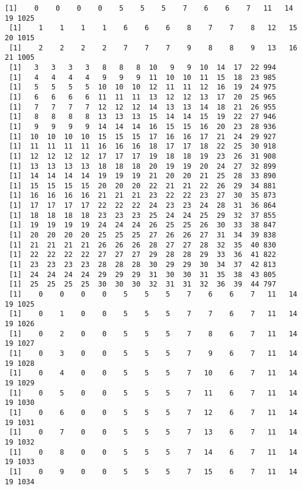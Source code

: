 \documentclass[11pt]{article}
\begin{document}
    \begin{Verbatim}[commandchars=\\\{\}]
 [1]    0    0    0    0    5    5    5    7    6    6    7   11   14   19 1025
 [1]    1    1    1    1    6    6    6    8    7    7    8   12   15   20 1015
 [1]    2    2    2    2    7    7    7    9    8    8    9   13   16   21 1005
 [1]   3   3   3   3   8   8   8  10   9   9  10  14  17  22 994
 [1]   4   4   4   4   9   9   9  11  10  10  11  15  18  23 985
 [1]   5   5   5   5  10  10  10  12  11  11  12  16  19  24 975
 [1]   6   6   6   6  11  11  11  13  12  12  13  17  20  25 965
 [1]   7   7   7   7  12  12  12  14  13  13  14  18  21  26 955
 [1]   8   8   8   8  13  13  13  15  14  14  15  19  22  27 946
 [1]   9   9   9   9  14  14  14  16  15  15  16  20  23  28 936
 [1]  10  10  10  10  15  15  15  17  16  16  17  21  24  29 927
 [1]  11  11  11  11  16  16  16  18  17  17  18  22  25  30 918
 [1]  12  12  12  12  17  17  17  19  18  18  19  23  26  31 908
 [1]  13  13  13  13  18  18  18  20  19  19  20  24  27  32 899
 [1]  14  14  14  14  19  19  19  21  20  20  21  25  28  33 890
 [1]  15  15  15  15  20  20  20  22  21  21  22  26  29  34 881
 [1]  16  16  16  16  21  21  21  23  22  22  23  27  30  35 873
 [1]  17  17  17  17  22  22  22  24  23  23  24  28  31  36 864
 [1]  18  18  18  18  23  23  23  25  24  24  25  29  32  37 855
 [1]  19  19  19  19  24  24  24  26  25  25  26  30  33  38 847
 [1]  20  20  20  20  25  25  25  27  26  26  27  31  34  39 838
 [1]  21  21  21  21  26  26  26  28  27  27  28  32  35  40 830
 [1]  22  22  22  22  27  27  27  29  28  28  29  33  36  41 822
 [1]  23  23  23  23  28  28  28  30  29  29  30  34  37  42 813
 [1]  24  24  24  24  29  29  29  31  30  30  31  35  38  43 805
 [1]  25  25  25  25  30  30  30  32  31  31  32  36  39  44 797
 [1]    0    0    0    0    5    5    5    7    6    6    7   11   14   19 1025
 [1]    0    1    0    0    5    5    5    7    7    6    7   11   14   19 1026
 [1]    0    2    0    0    5    5    5    7    8    6    7   11   14   19 1027
 [1]    0    3    0    0    5    5    5    7    9    6    7   11   14   19 1028
 [1]    0    4    0    0    5    5    5    7   10    6    7   11   14   19 1029
 [1]    0    5    0    0    5    5    5    7   11    6    7   11   14   19 1030
 [1]    0    6    0    0    5    5    5    7   12    6    7   11   14   19 1031
 [1]    0    7    0    0    5    5    5    7   13    6    7   11   14   19 1032
 [1]    0    8    0    0    5    5    5    7   14    6    7   11   14   19 1033
 [1]    0    9    0    0    5    5    5    7   15    6    7   11   14   19 1034

\end{Verbatim}
\end{document}
